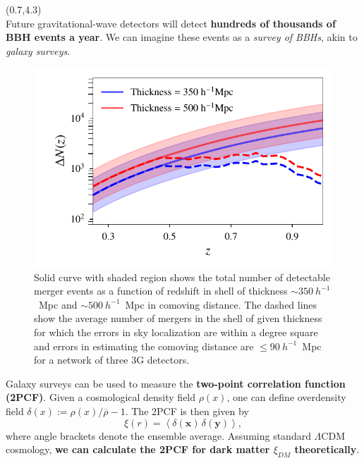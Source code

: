 \documentclass[a1,portrait]{a1poster}
\newcommand{\headingcolor}{\color{BannerElevenColor}}
\newcommand{\x}{\mathbf{x}}
\newcommand{\y}{\mathbf{y}}
\def\LHead#1{\noindent{\LARGE \headingcolor #1}\smallskip}
\begin{document}
\begin{textblock}{7.3}(0.7,4.3)	%
\LHead{Introduction}\\
Future gravitational-wave detectors will detect \textbf{hundreds of thousands of BBH events a year}. We can imagine these events as a \textit{survey of BBHs}, akin to \textit{galaxy surveys}.

\begin{figure}
	\centering
	\includegraphics[scale=1.8]{Nz_vs_z.pdf}
	\caption{\small{Solid curve with shaded region shows the total number of detectable merger events as a function of redshift in shell of thickness $\sim 350~h^{-1}$~Mpc and $\sim 500~h^{-1}$~Mpc in comoving distance. The dashed lines show the average number of mergers in the shell of given thickness for which the errors in sky localization are within a degree square and errors in estimating the comoving distance are $\le 90~h^{-1}$~Mpc for a network of three 3G detectors.}} 
	\label{fig:mergers_events}
\end{figure}
Galaxy surveys can be used to measure the \textbf{two-point correlation function (2PCF)}. Given a cosmological density field $ \rho(x) $, one can define overdensity field $\delta(x) := \rho(x) / \overline{\rho} - 1$.
The 2PCF is  then given by
\begin{equation}
\xi({r}) = \left<\delta(\x) \, \delta(\y)\right> \label{corrfunc},
\end{equation}
where angle brackets denote the ensemble average. Assuming standard $ \Lambda $CDM cosmology, \textbf{we can calculate the 2PCF for dark matter $ \xi_{DM} $ theoretically}.\\


\end{textblock}
\end{document}
